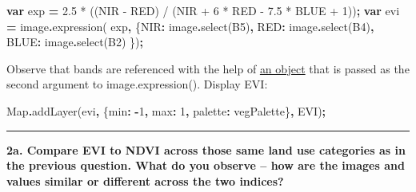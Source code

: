 \documentclass[
]{article}
\newenvironment{Shaded}{\begin{snugshade}}{\end{snugshade}}
\newcommand{\BuiltInTok}[1]{#1}
\newcommand{\DataTypeTok}[1]{\textcolor[rgb]{0.13,0.29,0.53}{#1}}
\newcommand{\DecValTok}[1]{\textcolor[rgb]{0.00,0.00,0.81}{#1}}
\newcommand{\FunctionTok}[1]{\textcolor[rgb]{0.00,0.00,0.00}{#1}}
\newcommand{\KeywordTok}[1]{\textcolor[rgb]{0.13,0.29,0.53}{\textbf{#1}}}
\newcommand{\NormalTok}[1]{#1}
\newcommand{\OperatorTok}[1]{\textcolor[rgb]{0.81,0.36,0.00}{\textbf{#1}}}
\newcommand{\StringTok}[1]{\textcolor[rgb]{0.31,0.60,0.02}{#1}}
\begin{document}
\begin{Shaded}
\begin{Highlighting}[]
\KeywordTok{var}\NormalTok{ exp }\OperatorTok{=} \StringTok{\textquotesingle{}2.5  * ((NIR {-} RED) / (NIR + 6 * RED {-} 7.5 * BLUE + 1))\textquotesingle{}}\OperatorTok{;}
\KeywordTok{var}\NormalTok{ evi }\OperatorTok{=}\NormalTok{ image}\OperatorTok{.}\FunctionTok{expression}\NormalTok{( exp}\OperatorTok{,} 
\NormalTok{                            \{}\StringTok{\textquotesingle{}NIR\textquotesingle{}}\OperatorTok{:}\NormalTok{ image}\OperatorTok{.}\FunctionTok{select}\NormalTok{(}\StringTok{\textquotesingle{}B5\textquotesingle{}}\NormalTok{)}\OperatorTok{,}
                             \StringTok{\textquotesingle{}RED\textquotesingle{}}\OperatorTok{:}\NormalTok{ image}\OperatorTok{.}\FunctionTok{select}\NormalTok{(}\StringTok{\textquotesingle{}B4\textquotesingle{}}\NormalTok{)}\OperatorTok{,}
                             \StringTok{\textquotesingle{}BLUE\textquotesingle{}}\OperatorTok{:}\NormalTok{ image}\OperatorTok{.}\FunctionTok{select}\NormalTok{(}\StringTok{\textquotesingle{}B2\textquotesingle{}}\NormalTok{)}
\NormalTok{                            \})}\OperatorTok{;}  
\end{Highlighting}
\end{Shaded}

Observe that bands are referenced with the help of \href{https://developer.mozilla.org/en-US/docs/Web/JavaScript/Guide/Grammar_and_Types\#Object_literals}{an object} that is passed as the second argument to image.expression(). Display EVI:

\begin{Shaded}
\begin{Highlighting}[]
\BuiltInTok{Map}\OperatorTok{.}\FunctionTok{addLayer}\NormalTok{(evi}\OperatorTok{,}  
\NormalTok{             \{}\DataTypeTok{min}\OperatorTok{:} \OperatorTok{{-}}\DecValTok{1}\OperatorTok{,} \DataTypeTok{max}\OperatorTok{:} \DecValTok{1}\OperatorTok{,}  \DataTypeTok{palette}\OperatorTok{:}\NormalTok{ vegPalette\}}\OperatorTok{,} 
             \StringTok{\textquotesingle{}EVI\textquotesingle{}}\NormalTok{)}\OperatorTok{;}  
\end{Highlighting}
\end{Shaded}

\begin{center}\rule{0.5\linewidth}{0.5pt}\end{center}

\textbf{2a. Compare EVI to NDVI across those same land use categories as in the previous question. What do you observe -- how are the images and values similar or different across the two indices?}
\end{document}
